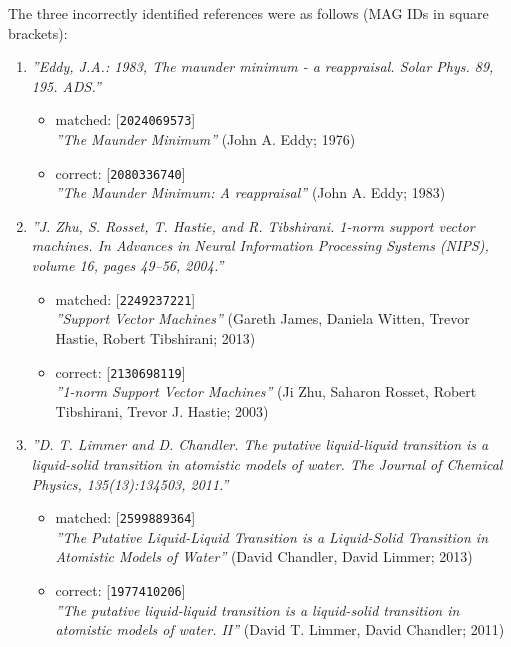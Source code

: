 The three incorrectly identified references were as follows (MAG IDs in square brackets):
\begin{enumerate}
    \item \emph{''Eddy, J.A.: 1983, The maunder minimum - a reappraisal. Solar Phys. 89, 195. ADS.''}
    \begin{itemize}
        \item matched: [\texttt{2024069573}]\\\emph{''The Maunder Minimum''} (John A. Eddy; 1976)
        \item correct: [\texttt{2080336740}]\\\emph{''The Maunder Minimum: A reappraisal''} (John A. Eddy; 1983)
    \end{itemize}
    \item \emph{''J. Zhu, S. Rosset, T. Hastie, and R. Tibshirani. 1-norm support vector machines. In Advances in Neural Information Processing Systems (NIPS), volume 16, pages 49–56, 2004.''}
    \begin{itemize}
        \item matched: [\texttt{2249237221}]\\\emph{''Support Vector Machines''} (Gareth James, Daniela Witten, Trevor Hastie, Robert Tibshirani; 2013)
        \item correct: [\texttt{2130698119}]\\\emph{''1-norm Support Vector Machines''} (Ji Zhu, Saharon Rosset, Robert Tibshirani, Trevor J. Hastie; 2003)
    \end{itemize}
    \item \emph{''D. T. Limmer and D. Chandler. The putative liquid-liquid transition is a liquid-solid transition in atomistic models of water. The Journal of Chemical Physics, 135(13):134503, 2011.''}
    \begin{itemize}
        \item matched: [\texttt{2599889364}]\\\emph{''The Putative Liquid-Liquid Transition is a Liquid-Solid Transition in Atomistic Models of Water''} (David Chandler, David Limmer; 2013)
        \item correct: [\texttt{1977410206}]\\\emph{''The putative liquid-liquid transition is a liquid-solid transition in atomistic models of water. II''} (David T. Limmer, David Chandler; 2011)
    \end{itemize}
\end{enumerate}

